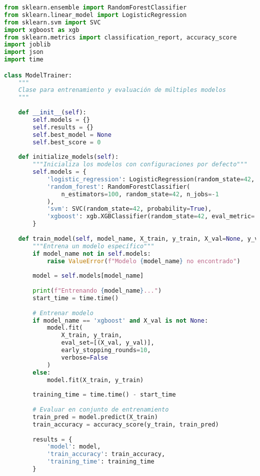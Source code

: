 \begin{lstlisting}[language=Python, caption=Módulo de entrenamiento de modelos]
from sklearn.ensemble import RandomForestClassifier
from sklearn.linear_model import LogisticRegression
from sklearn.svm import SVC
import xgboost as xgb
from sklearn.metrics import classification_report, accuracy_score
import joblib
import json
import time

class ModelTrainer:
    """
    Clase para entrenamiento y evaluación de múltiples modelos
    """
    
    def __init__(self):
        self.models = {}
        self.results = {}
        self.best_model = None
        self.best_score = 0
    
    def initialize_models(self):
        """Inicializa los modelos con configuraciones por defecto"""
        self.models = {
            'logistic_regression': LogisticRegression(random_state=42, max_iter=1000),
            'random_forest': RandomForestClassifier(
                n_estimators=100, random_state=42, n_jobs=-1
            ),
            'svm': SVC(random_state=42, probability=True),
            'xgboost': xgb.XGBClassifier(random_state=42, eval_metric='logloss')
        }
    
    def train_model(self, model_name, X_train, y_train, X_val=None, y_val=None):
        """Entrena un modelo específico"""
        if model_name not in self.models:
            raise ValueError(f"Modelo {model_name} no encontrado")
        
        model = self.models[model_name]
        
        print(f"Entrenando {model_name}...")
        start_time = time.time()
        
        # Entrenar modelo
        if model_name == 'xgboost' and X_val is not None:
            model.fit(
                X_train, y_train,
                eval_set=[(X_val, y_val)],
                early_stopping_rounds=10,
                verbose=False
            )
        else:
            model.fit(X_train, y_train)
        
        training_time = time.time() - start_time
        
        # Evaluar en conjunto de entrenamiento
        train_pred = model.predict(X_train)
        train_accuracy = accuracy_score(y_train, train_pred)
        
        results = {
            'model': model,
            'train_accuracy': train_accuracy,
            'training_time': training_time
        }
        

\end{lstlisting}
